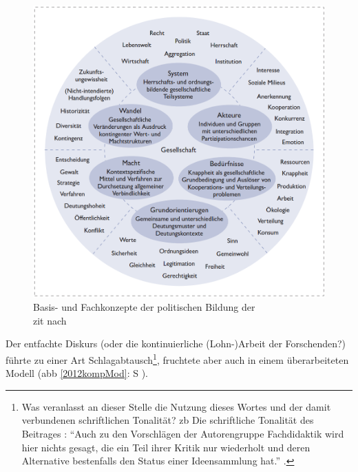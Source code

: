 \begin{figure}[htb]
    \centering
    \includegraphics[width=1\linewidth]{Autorengruppe p. 170 nach GloeOeftering p. 109.png}
    \caption{Basis- und Fachkonzepte der politischen Bildung der \\ \textcite[170]{Besand.2011} \gls{zit} nach \textcite[109]{Gloe2020}}
    \label{2011kompMod}
\end{figure}

Der entfachte Diskurs (oder die kontinuierliche (Lohn-)Arbeit der Forschenden?) führte zu einer Art Schlagabtausch\footnote{Was veranlasst an dieser Stelle die Nutzung dieses Wortes und der damit verbundenen schriftlichen Tonalität? \Gls{zb} Die schriftliche Tonalität des Beitrages : \enquote{Auch zu den Vorschlägen der Autorengruppe Fachdidaktik wird hier nichts gesagt, die ein Teil ihrer Kritik nur wiederholt und deren Alternative bestenfalls den Status einer Ideensammlung hat.} \autocite[135]{Massing.2011}.}, fruchtete aber auch in einem überarbeiteten Modell (\gls{abb} \ref{2012kompMod}: \gls{S} \pageref{2012kompMod}).

